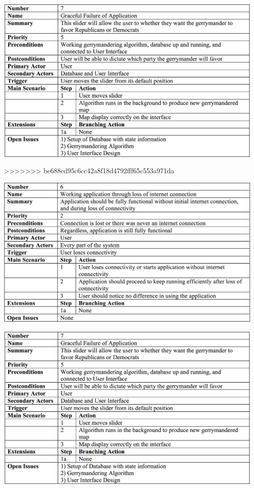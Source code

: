 \documentclass{article}
\begin{document}
\begin{addmargin}[4em]{0em}
\begin{center}
\hspace*{-2cm}      
\includegraphics[scale=.25]{Failures.png}
\end{center}
>>>>>>> be688cd95c6cc42a8f18d4792fff65c553a971da

\begin{center}
\hspace*{-2cm}      
\includegraphics[scale=.25]{LossOfNetwork.png}
\end{center}

\begin{center}
\hspace*{-2cm}      
\includegraphics[scale=.25]{Failures.png}
\end{center}

\end{addmargin}
\end{document}
